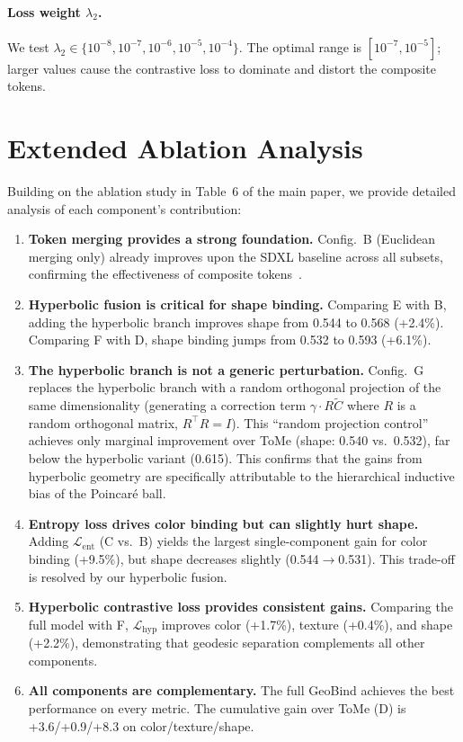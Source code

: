 \documentclass[sigconf,nonacm]{acmart}
\begin{document}
\paragraph{Loss weight $\lambda_2$.} We test $\lambda_2 \in \{10^{-8}, 10^{-7}, 10^{-6}, 10^{-5}, 10^{-4}\}$. The optimal range is $[10^{-7}, 10^{-5}]$; larger values cause the contrastive loss to dominate and distort the composite tokens.

\section{Extended Ablation Analysis}
\label{sec:extended_ablation}

Building on the ablation study in Table~6 of the main paper, we provide detailed analysis of each component's contribution:

\begin{enumerate}
\item \textbf{Token merging provides a strong foundation.} Config.~B (Euclidean merging only) already improves upon the SDXL baseline across all subsets, confirming the effectiveness of composite tokens~\cite{hu2024tome}.

\item \textbf{Hyperbolic fusion is critical for shape binding.} Comparing E with B, adding the hyperbolic branch improves shape from 0.544 to 0.568 (+2.4\%). Comparing F with D, shape binding jumps from 0.532 to 0.593 (+6.1\%).

\item \textbf{The hyperbolic branch is not a generic perturbation.} Config.~G replaces the hyperbolic branch with a random orthogonal projection of the same dimensionality (generating a correction term $\gamma \cdot R\tilde{C}$ where $R$ is a random orthogonal matrix, $R^\top R = I$). This ``random projection control'' achieves only marginal improvement over ToMe (shape: 0.540 vs.\ 0.532), far below the hyperbolic variant (0.615). This confirms that the gains from hyperbolic geometry are specifically attributable to the hierarchical inductive bias of the Poincar\'e ball.

\item \textbf{Entropy loss drives color binding but can slightly hurt shape.} Adding $\mathcal{L}_{\text{ent}}$ (C vs.\ B) yields the largest single-component gain for color binding (+9.5\%), but shape decreases slightly (0.544$\to$0.531). This trade-off is resolved by our hyperbolic fusion.

\item \textbf{Hyperbolic contrastive loss provides consistent gains.} Comparing the full model with F, $\mathcal{L}_{\text{hyp}}$ improves color (+1.7\%), texture (+0.4\%), and shape (+2.2\%), demonstrating that geodesic separation complements all other components.

\item \textbf{All components are complementary.} The full GeoBind achieves the best performance on every metric. The cumulative gain over ToMe (D) is +3.6/+0.9/+8.3 on color/texture/shape.
\end{enumerate}
\end{document}
